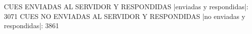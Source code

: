CUES ENVIADAS AL SERVIDOR Y RESPONDIDAS
|enviadas y respondidas|: 3071
CUES NO ENVIADAS AL SERVIDOR Y RESPONDIDAS
|no enviadas y respondidas|: 3861